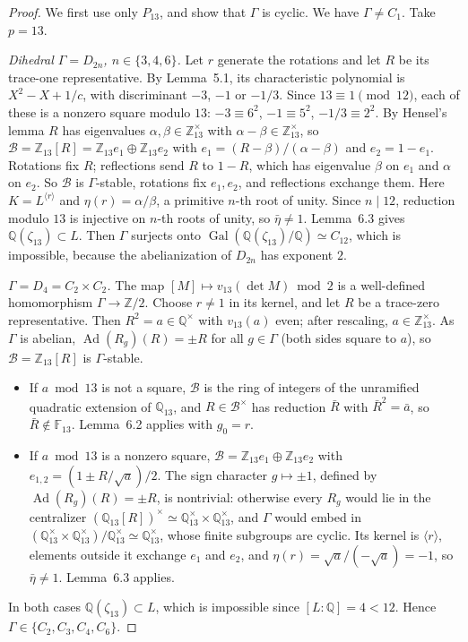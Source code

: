 \documentclass[11pt]{article}
\newcommand{\Q}{\mathbb Q}
\newcommand{\Z}{\mathbb Z}
\newcommand{\F}{\mathbb F}
\DeclareMathOperator{\Gal}{Gal}
\DeclareMathOperator{\Ad}{Ad}
\begin{document}
\begin{proof}
We first use only \(P_{13}\), and show that \(\Gamma\) is cyclic. We
have \(\Gamma\ne C_1\). Take \(p=13\).

\emph{Dihedral \(\Gamma=D_{2n}\), \(n\in\{3,4,6\}\).} Let \(r\)
generate the rotations and let \(R\) be its trace-one representative.
By Lemma~5.1, its characteristic polynomial is \(X^2-X+1/c\), with
discriminant \(-3\), \(-1\) or \(-1/3\). Since
\(13\equiv1\pmod{12}\), each of these is a nonzero square modulo
\(13\): \(-3\equiv6^2\), \(-1\equiv5^2\), \(-1/3\equiv2^2\). By
Hensel's lemma \(R\) has eigenvalues \(\alpha,\beta\in\Z_{13}^\times\)
with \(\alpha-\beta\in\Z_{13}^\times\), so
\(\mathcal B=\Z_{13}[R]=\Z_{13}e_1\oplus\Z_{13}e_2\) with
\(e_1=(R-\beta)/(\alpha-\beta)\) and \(e_2=1-e_1\). Rotations fix
\(R\); reflections send \(R\) to \(1-R\), which has eigenvalue
\(\beta\) on \(e_1\) and \(\alpha\) on \(e_2\). So \(\mathcal B\) is
\(\Gamma\)-stable, rotations fix \(e_1,e_2\), and reflections exchange
them. Here \(K=L^{\langle r\rangle}\) and \(\eta(r)=\alpha/\beta\), a
primitive \(n\)-th root of unity. Since \(n\mid12\), reduction modulo
\(13\) is injective on \(n\)-th roots of unity, so \(\bar\eta\ne1\).
Lemma~6.3 gives \(\Q(\zeta_{13})\subset L\). Then \(\Gamma\) surjects
onto \(\Gal(\Q(\zeta_{13})/\Q)\simeq C_{12}\), which is impossible,
because the abelianization of \(D_{2n}\) has exponent \(2\).

\emph{\(\Gamma=D_4=C_2\times C_2\).} The map
\([M]\mapsto v_{13}(\det M)\bmod2\) is a well-defined homomorphism
\(\Gamma\to\Z/2\). Choose \(r\ne1\) in its kernel, and let \(R\) be a
trace-zero representative. Then \(R^2=a\in\Q^\times\) with
\(v_{13}(a)\) even; after rescaling, \(a\in\Z_{13}^\times\). As
\(\Gamma\) is abelian, \(\Ad(R_g)(R)=\pm R\) for all \(g\in\Gamma\)
(both sides square to \(a\)), so \(\mathcal B=\Z_{13}[R]\) is
\(\Gamma\)-stable.
\begin{itemize}
\item If \(a\bmod13\) is not a square, \(\mathcal B\) is the ring of
integers of the unramified quadratic extension of \(\Q_{13}\), and
\(R\in\mathcal B^\times\) has reduction \(\bar R\) with
\(\bar R^2=\bar a\), so \(\bar R\notin\F_{13}\). Lemma~6.2 applies with
\(g_0=r\).
\item If \(a\bmod13\) is a nonzero square,
\(\mathcal B=\Z_{13}e_1\oplus\Z_{13}e_2\) with
\(e_{1,2}=(1\pm R/\sqrt a)/2\). The sign character \(g\mapsto\pm1\),
defined by \(\Ad(R_g)(R)=\pm R\), is nontrivial: otherwise every
\(R_g\) would lie in the centralizer
\((\Q_{13}[R])^\times\simeq\Q_{13}^\times\times\Q_{13}^\times\), and
\(\Gamma\) would embed in
\((\Q_{13}^\times\times\Q_{13}^\times)/\Q_{13}^\times\simeq\Q_{13}^\times\),
whose finite subgroups are cyclic. Its kernel is \(\langle r\rangle\),
elements outside it exchange \(e_1\) and \(e_2\), and
\(\eta(r)=\sqrt a/(-\sqrt a)=-1\), so \(\bar\eta\ne1\). Lemma~6.3
applies.
\end{itemize}
In both cases \(\Q(\zeta_{13})\subset L\), which is impossible since
\([L:\Q]=4<12\). Hence \(\Gamma\in\{C_2,C_3,C_4,C_6\}\).


\end{proof}
\end{document}

